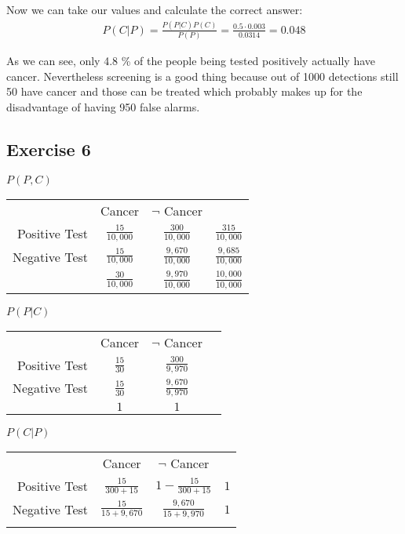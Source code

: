 Now we can take our values and calculate the correct answer:
\begin{align*}
P(C|P) = \frac{P(P|C)P(C)}{P(P)} = \frac{0.5 \cdot 0.003}{0.0314} = 0.048
\end{align*}

As we can see, only 4.8 \% of the people being tested positively actually have cancer. Nevertheless screening is a good thing because out of 1000 detections still 50 have cancer and those can be treated which probably makes up for the disadvantage of having 950 false alarms.  

\subsection*{Exercise 6}
\textbf{$P(P, C)$}
\begin{tabular}{ r|c|c|l }
\multicolumn{1}{r}{}
      &  \multicolumn{1}{c}{Cancer}
               &  \multicolumn{1}{c}{$\neg$ Cancer} \\
               \cline{2-3}
Positive Test  & $\frac{15}{10,000}$ & $\frac{  300}{10,000}$     & $\frac{  315}{10,000}$\\ 
               \cline{2-3}
Negative Test  & $\frac{15}{10,000}$ & $\frac{9,670}{10,000}$     & $\frac{9,685}{10,000}$\\
               \cline{2-3}
\multicolumn{1}{r}{} 
      & \multicolumn{1}{c}{$\frac{30}{10,000}$} 
              & \multicolumn{1}{c}{$\frac{9,970}{10,000}$}
                      & \multicolumn{1}{c}{$\frac{10,000}{10,000}$}\\
\end{tabular}

\textbf{$P(P|C)$}
\begin{tabular}{ r|c|c|l }
\multicolumn{1}{r}{}
      &  \multicolumn{1}{c}{Cancer}
               &  \multicolumn{1}{c}{$\neg$ Cancer} \\
               \cline{2-3}
Positive Test  & $\frac{15}{30}$ & $\frac{ 300}{9,970}$     & \\ 
               \cline{2-3}
Negative Test  & $\frac{15}{30}$ & $\frac{9,670}{9,970}$     & \\
               \cline{2-3}
\multicolumn{1}{r}{} 
      & \multicolumn{1}{c}{$1$} 
              & \multicolumn{1}{c}{$1$} 
                      & \multicolumn{1}{c}{}\\
\end{tabular}

\textbf{$P(C|P)$}
\begin{tabular}{ r|c|c|l }
\multicolumn{1}{r}{}
      &  \multicolumn{1}{c}{Cancer}
               &  \multicolumn{1}{c}{$\neg$ Cancer} \\
               \cline{2-3}
Positive Test  & $\frac{15}{300 + 15}$   & $1 - \frac{15}{300+15}$  & $1$\\ 
               \cline{2-3}
Negative Test  & $\frac{15}{15 + 9,670}$ & $\frac{9,670}{15+9,970}$ & $1$\\
               \cline{2-3}
\multicolumn{1}{r}{} 
      & \multicolumn{1}{c}{} 
              & \multicolumn{1}{c}{} 
                      & \multicolumn{1}{c}{}\\
\end{tabular}


